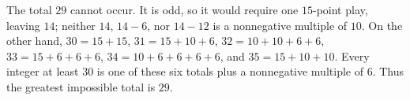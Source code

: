 The total $29$ cannot occur. It is odd, so it would require one $15$-point play, leaving $14$; neither $14$, $14-6$, nor $14-12$ is a nonnegative multiple of $10$. On the other hand, $30=15+15$, $31=15+10+6$, $32=10+10+6+6$, $33=15+6+6+6$, $34=10+6+6+6+6$, and $35=15+10+10$. Every integer at least $30$ is one of these six totals plus a nonnegative multiple of $6$. Thus the greatest impossible total is $\boxed{29}$.
